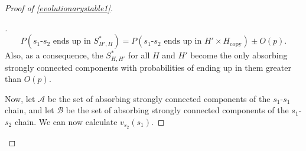 \documentclass[12pt]{article}
\theoremstyle{definition}
\theoremstyle{remark}
\newenvironment{subproof}[1][\proofname]{%
  \renewcommand{\qedsymbol}{$\blacksquare$}%
  \begin{proof}[#1]%
}{%
  \end{proof}%
}
\begin{document}
\begin{proof}[Proof of \cref{evolutionarystable1}]
\begin{subproof}
        \begin{equation}
          \label{eqshh}
          P(\text{$s_1$-$s_2$ ends up in $S_{H',H}^*$}) = P(\text{$s_1$-$s_2$ ends up in $H' \times H_\text{copy}$})  \pm O(p).
        \end{equation}
        Also, as a consequence, the $S_{H,H'}^*$ for all $H$ and $H'$ become the only absorbing strongly connected components with probabilities of ending up in them greater than $O(p)$.

        Now, let $\mathcal{A}$ be the set of absorbing strongly connected components of the $s_1$-$s_1$ chain, and let $\mathcal{B}$ be the set of absorbing strongly connected components of the $s_1$-$s_2$ chain. We can now calculate $v_{s_2}(s_1)$.



\end{subproof}
\end{proof}
\end{document}
